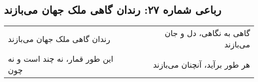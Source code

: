 \begin{center}
\section*{رباعی شماره ۲۷: رندان گاهی ملک جهان می‌بازند}
\label{sec:027}
\begin{longtable}{l p{0.5cm} r}
رندان گاهی ملک جهان می‌بازند
&&
گاهی به نگاهی، دل و جان می‌بازند
\\
این طور قمار، نه چند است و نه چون
&&
هر طور برآید، آنچنان می‌بازند
\\
\end{longtable}
\end{center}
